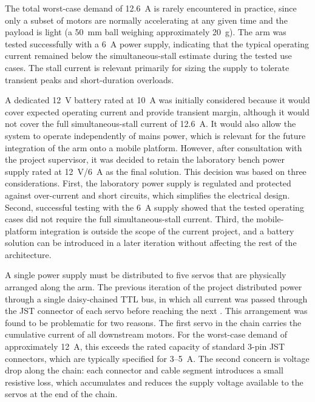 The total worst-case demand of 12.6~A is rarely encountered in 
practice, since only a subset of motors are normally accelerating 
at any given time and the payload is light (a 50~mm ball weighing 
approximately 20~g). The arm was tested successfully with a 
6~A power supply, indicating that the typical operating current 
remained below the simultaneous-stall estimate during the tested 
use cases. The stall current is relevant primarily for sizing the 
supply to tolerate transient peaks and short-duration overloads.

\label{sec:power-supply-selection}
A dedicated 12~V battery rated at 10~A was initially considered because 
it would cover expected operating current and provide transient margin, 
although it would not cover the full simultaneous-stall current of 
12.6~A. It would also allow the system to operate independently of 
mains power, which is relevant for the future integration of the arm 
onto a mobile platform. 
However, after consultation with the project supervisor, it was 
decided to retain the laboratory bench power supply rated at 
12~V/6~A as the final solution. This decision was based on three 
considerations. First, the laboratory power supply is regulated and 
protected against over-current and short circuits, which simplifies 
the electrical design. Second, successful testing with the 6~A supply 
showed that the tested operating cases did not require the full 
simultaneous-stall current. Third, the mobile-platform integration is 
outside the scope of the current project, and a battery solution can 
be introduced in a later iteration without affecting the rest of the 
architecture.

\label{sec:power-distribution}
A single power supply must be distributed to five servos that are 
physically arranged along the arm. The previous iteration of the 
project distributed power through a single daisy-chained TTL bus, 
in which all current was passed through the JST connector of each 
servo before reaching the next \cite{sortify}. This arrangement was 
found to be problematic for two reasons. The first servo in the 
chain carries the cumulative current of all downstream motors. For 
the worst-case demand of approximately 12~A, this exceeds the rated 
capacity of standard 3-pin JST connectors, which are typically 
specified for 3--5~A. The second concern is voltage drop along the 
chain: each connector and cable segment introduces a small resistive 
loss, which accumulates and reduces the supply voltage available to 
the servos at the end of the chain.

